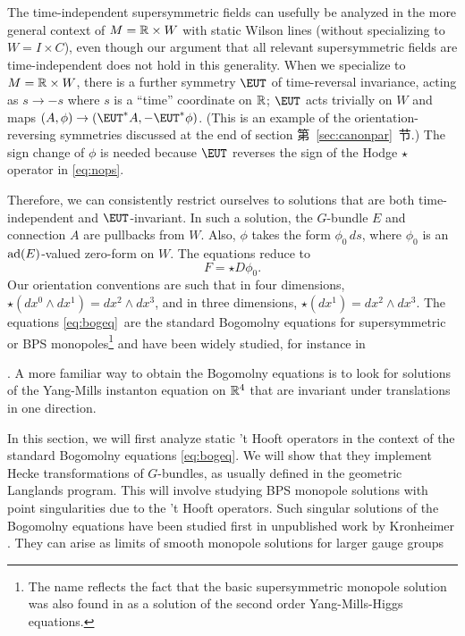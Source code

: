 The time-independent supersymmetric fields can usefully be
analyzed in the more general context of $M=\Bbb{R}\times W$ with
static Wilson lines (without specializing to $W=I\times C$), even
though our argument that all relevant supersymmetric fields are
time-independent does not hold in this generality. When we
specialize to $M=\Bbb{R}\times W$, there is a further symmetry
${\EUT}$ of time-reversal invariance, acting as $s\to -s$ where
$s$ is a ``time'' coordinate on $\Bbb{R}$; ${\EUT}$ acts trivially
on $W$ and maps $(A,\phi)\to ({\EUT}^*A,-{\EUT}^*\phi)$. (This is
an example of the orientation-reversing symmetries discussed at
the end of section 第~\ref{sec:canonpar}~节.) The sign change of $\phi$ is needed
because ${\EUT}$ reverses the sign of the Hodge $\star$ operator
in \eqref{eq:nops}.

Therefore, we can consistently restrict ourselves to solutions
that are both time-independent and $\EUT$-invariant. In such a
solution, the $G$-bundle $E$ and connection $A$ are pullbacks from
$W$. Also, $\phi$ takes the form $\phi_0\,ds$, where $\phi_0$ is
an ${\rm ad}(E)$-valued zero-form on $W$.  The equations reduce to
\setcounter{equation}{4}
\begin{equation}\label{eq:bogeq}
F=\star D\phi_0.
\end{equation}
 Our orientation conventions are such
that in four dimensions, $\star(dx^0\wedge dx^1)=dx^2\wedge dx^3$,
and in three dimensions, $\star(dx^1)=dx^2\wedge dx^3$. The
equations \eqref{eq:bogeq}\ are the standard Bogomolny equations
\cite{ref105} for
supersymmetric or BPS monopoles\footnote{The name reflects the fact
that the basic supersymmetric monopole solution was also found in
\cite{ref106} as a solution of the second
order Yang-Mills-Higgs equations.} and have been widely studied,
for instance in 

\cite{ref107,ref108,ref109}.  A more familiar way to obtain the
Bogomolny equations is to look for solutions of the Yang-Mills
instanton equation on $\Bbb{R}^4$ that are invariant under
translations in one direction.

In this section, we will first analyze static 't Hooft operators
in the context of the standard Bogomolny equations \eqref{eq:bogeq}.  We
will show that they implement Hecke transformations of
$G$-bundles, as usually defined in the geometric Langlands
program.   This will involve studying BPS monopole solutions with
point singularities due to the 't Hooft operators.  Such singular
solutions of the Bogomolny equations have been studied first in
unpublished work by Kronheimer \cite{ref110}.  They can
arise as limits of smooth monopole solutions for larger gauge
groups 


